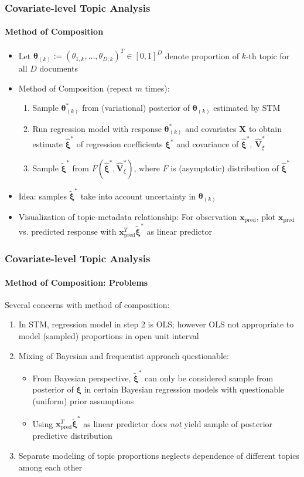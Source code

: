 \documentclass[xcolor=dvipsnames]{beamer}
\begin{document}
\begin{frame}
\frametitle{Covariate-level Topic Analysis}
\framesubtitle{Method of Composition}
\begin{itemize}
\item Let $\boldsymbol{\theta}_{(k)}:=(\theta_{1,k}, \dots, \theta_{D,k})^T \in [0,1]^{D}$ denote proportion of $k$-th topic for all $D$ documents
\item Method of Composition (repeat $m$ times):
\begin{enumerate}
\item Sample $\boldsymbol{\theta}^*_{(k)}$ from (variational) posterior of $\boldsymbol{\theta}_{(k)}$ estimated by STM
\item Run regression model with response $\boldsymbol{\theta}^*_{(k)}$ and covariates $\boldsymbol{X}$ to obtain estimate $\hat{\boldsymbol{\xi}}^*$ of regression coefficients $\boldsymbol{\xi}^*$ and covariance of $\hat{\boldsymbol{\xi}}^*$, $\hat{\boldsymbol{V}}^*_{\xi}$
\item Sample $\tilde{\boldsymbol{\xi}}^*$ from $F(\hat{\boldsymbol{\xi}}^*, \hat{\boldsymbol{V}}^*_{\xi})$, where $F$ is (asymptotic) distribution of $\hat{\boldsymbol{\xi}}^*$
\end{enumerate}
\item Idea: samples $\tilde{\boldsymbol{\xi}}^*$ take into account uncertainty in $\boldsymbol{\theta}_{(k)}$
\item Visualization of topic-metadata relationship: For observation $\boldsymbol{x}_{\text{pred}}$, plot $\boldsymbol{x}_{\text{pred}}$ vs. predicted response with $\boldsymbol{x}_{\text{pred}}^T \tilde{\boldsymbol{\xi}}^*$ as linear predictor
\end{itemize}
\end{frame}

\begin{frame}
\frametitle{Covariate-level Topic Analysis}
\framesubtitle{Method of Composition: Problems}
Several concerns with method of composition:
\begin{enumerate}
\item In STM, regression model in step 2 is OLS; however OLS not appropriate to model (sampled) proportions in open unit interval
\item Mixing of Bayesian and frequentist approach questionable:
\begin{itemize}
\item From Bayesian perspective, $\tilde{\boldsymbol{\xi}}^*$ can only be considered sample from posterior of $\boldsymbol{\xi}$ in certain Bayesian regression models with questionable (uniform) prior assumptions
\item Using $\boldsymbol{x}_{\text{pred}}^T \tilde{\boldsymbol{\xi}}^*$  as linear predictor does \textit{not} yield sample of posterior predictive distribution
\end{itemize}
\item Separate modeling of topic proportions neglects dependence of different topics among each other
\end{enumerate}
\end{frame}
\end{document}
